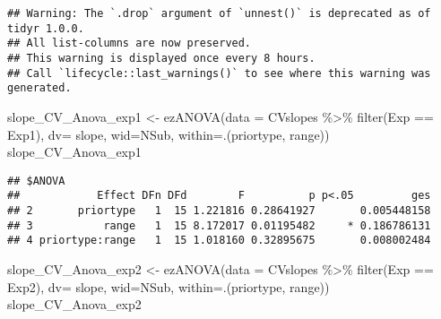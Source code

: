 \documentclass[
]{article}
\newenvironment{Shaded}{\begin{snugshade}}{\end{snugshade}}
\newcommand{\AttributeTok}[1]{\textcolor[rgb]{0.77,0.63,0.00}{#1}}
\newcommand{\ConstantTok}[1]{\textcolor[rgb]{0.00,0.00,0.00}{#1}}
\newcommand{\FunctionTok}[1]{\textcolor[rgb]{0.00,0.00,0.00}{#1}}
\newcommand{\NormalTok}[1]{#1}
\newcommand{\OtherTok}[1]{\textcolor[rgb]{0.56,0.35,0.01}{#1}}
\newcommand{\SpecialCharTok}[1]{\textcolor[rgb]{0.00,0.00,0.00}{#1}}
\newcommand{\StringTok}[1]{\textcolor[rgb]{0.31,0.60,0.02}{#1}}
\begin{document}
\begin{verbatim}
## Warning: The `.drop` argument of `unnest()` is deprecated as of tidyr 1.0.0.
## All list-columns are now preserved.
## This warning is displayed once every 8 hours.
## Call `lifecycle::last_warnings()` to see where this warning was generated.
\end{verbatim}

\begin{Shaded}
\end{Shaded}

\begin{Shaded}
\begin{Highlighting}[]
\NormalTok{slope\_CV\_Anova\_exp1 }\OtherTok{\textless{}{-}} \FunctionTok{ezANOVA}\NormalTok{(}\AttributeTok{data =}\NormalTok{ CVslopes }\SpecialCharTok{\%\textgreater{}\%} \FunctionTok{filter}\NormalTok{(Exp }\SpecialCharTok{==} \StringTok{\textquotesingle{}Exp1\textquotesingle{}}\NormalTok{), }\AttributeTok{dv=}\NormalTok{ slope, }\AttributeTok{wid=}\NormalTok{NSub, }\AttributeTok{within=}\NormalTok{.(priortype, range))}
\NormalTok{slope\_CV\_Anova\_exp1}
\end{Highlighting}
\end{Shaded}

\begin{verbatim}
## $ANOVA
##            Effect DFn DFd        F          p p<.05         ges
## 2       priortype   1  15 1.221816 0.28641927       0.005448158
## 3           range   1  15 8.172017 0.01195482     * 0.186786131
## 4 priortype:range   1  15 1.018160 0.32895675       0.008002484
\end{verbatim}

\begin{Shaded}
\begin{Highlighting}[]
\NormalTok{slope\_CV\_Anova\_exp2 }\OtherTok{\textless{}{-}} \FunctionTok{ezANOVA}\NormalTok{(}\AttributeTok{data =}\NormalTok{ CVslopes }\SpecialCharTok{\%\textgreater{}\%} \FunctionTok{filter}\NormalTok{(Exp }\SpecialCharTok{==} \StringTok{\textquotesingle{}Exp2\textquotesingle{}}\NormalTok{), }\AttributeTok{dv=}\NormalTok{ slope, }\AttributeTok{wid=}\NormalTok{NSub, }\AttributeTok{within=}\NormalTok{.(priortype, range))}
\NormalTok{slope\_CV\_Anova\_exp2}
\end{Highlighting}
\end{Shaded}
\end{document}
